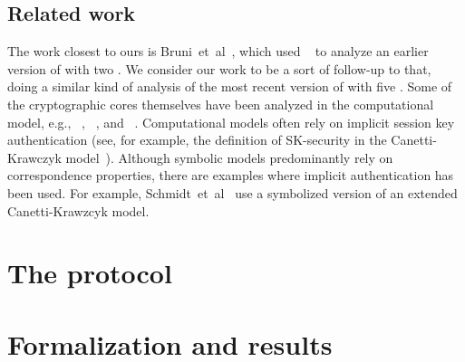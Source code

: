 \documentclass[runningheads, envcountsame, a4paper, draft, x11names]{llncs}
\newcommand{\spacehack}{\vspace{-1em}}
\newcommand{\fillhack}{\vspace{-0.5em}}
\begin{document}
\subsection{Related work}
\label{sec:relatedWork}
\fillhack
The work closest to ours is Bruni~et~al~\cite{DBLP:conf/secsr/BruniJPS18},
which used \mProverif~\cite{DBLP:conf/csfw/Blanchet01} to analyze an earlier version of \mEdhoc{} with two . %
%
We consider our work to be a sort of follow-up to that, doing a similar kind of analysis of the most recent version of \mEdhoc{} with
five .
%
%
%
%
Some of the cryptographic cores themselves have been analyzed in the
computational model, e.g., \mSigma{}~\cite{DBLP:conf/crypto/CanettiK02}, \mOptls{}~\cite{DBLP:conf/eurosp/KrawczykW16}, and \mNoise{}~\cite{DBLP:conf/eurosp/KobeissiNB19}.
%
Computational models often rely on implicit session key authentication
(see, for example, the definition of SK-security in the Canetti-Krawczyk model~\cite{DBLP:conf/crypto/CanettiK02}).
%
Although symbolic models predominantly rely on correspondence properties, there are examples where implicit authentication has been used.
%
For example, Schmidt~et~al~\cite{DBLP:conf/csfw/SchmidtMCB12} use a
symbolized version of an extended Canetti-Krawzcyk model.
%

\spacehack
\section{The \mEdhoc{} protocol}
\label{sec:edhoc}


\spacehack
\section{Formalization and results}
\label{sec:formalization}


\spacehack
\end{document}
